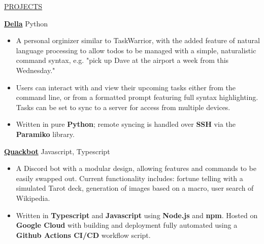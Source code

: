 \documentclass[11pt]{article}
\newcommand{\betteruline}[1]{
    \uline{#1}
}
\newcommand{\sectiontitle}[1]{
    \begingroup
        \titlebold
        \betteruline{\Large\uppercase{#1}  }
        \vspace{1.7mm}
    \endgroup
}
\newcommand{\sectioncontent}[1]{
    \begingroup
        \begin{FlushLeft}
        \vspace{-3mm}
        \sffamily\small#1
        \end{FlushLeft}
    \endgroup
    \vspace{2mm}
}
\newcommand{\project}[2]{
    \begingroup
        \textbf{\small#1}
        \hfill\color{black!70}\small{#2}
    \endgroup
}
\newcommand{\spacevv}{
    \vspace{2mm}
}
\begin{document}
\begin{paracol}{2}
        
    \sectiontitle{projects}
    \sectioncontent{
      \project{\href{https://github.com/keagud/della}{Della}}{Python}
        \begin{itemize}
          \item A personal orginizer similar to TaskWarrior, with the added feature of natural language processing to allow todos to be managed with a simple, naturalistic command syntax, e.g. "pick up Dave at the airport a week from this Wednesday." 
          \item Users can interact with and view their upcoming tasks either from the command line, or from a formatted prompt featuring full syntax highlighting. Tasks can be set to sync to a server for access from multiple devices.
          \item Written in pure \textbf{Python}; remote syncing is handled over \textbf{SSH} via the \textbf{Paramiko} library.
        \end{itemize}
        \spacevv
        
        \project{\href{https://github.com/keagud/Quackbot}{Quackbot}}{Javascript, Typescript}
        \begin{itemize}
            \item A Discord bot with a modular design, allowing features and commands to be easily swapped out. Current functionality includes: fortune telling with a simulated Tarot deck, generation of images based on a macro, user search of Wikipedia. 
            \item Written in \textbf{Typescript} and \textbf{Javascript} using \textbf{Node.js} and \textbf{npm}. Hosted on \textbf{Google Cloud} with building and deployment fully automated using a \textbf{Github Actions CI/CD } workflow script.
        \end{itemize}
        \spacevv

        
        \iffalse
        \project{\href{https://github.com/keagud/dateparse}{Dateparse}}{Python}
        \begin{itemize}
          \item A pure Python, dependency-free library for parsing natural language expressions about time, like "two weeks ago", "a week before Christmas", "in four months" into Python date objects. 
        \end{itemize}
        \spacevv
        \fi

}
\end{paracol}
\end{document}
